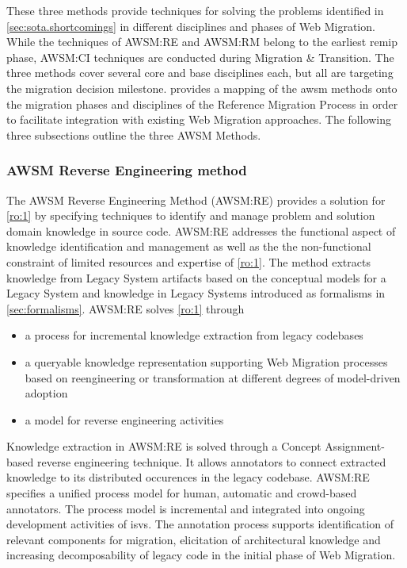These three methods provide techniques for solving the problems identified in \cref{sec:sota.shortcomings} in different  disciplines and phases of \gls{Web Migration}.
While the techniques of AWSM:RE and AWSM:RM belong to the earliest \gls{remip} phase, AWSM:CI techniques are conducted during Migration \& Transition.
The three methods cover several core and base disciplines each, but all are targeting the migration decision milestone.
 provides a mapping of the \gls{awsm} methods onto the migration phases and disciplines of the Reference Migration Process \autocite{Sneed2010ReMiP} in order to facilitate integration with existing \gls{Web Migration} approaches. %
The following three subsections outline the three AWSM Methods.

\hypertarget{awsm-reverse-engineering-method}{%
\subsubsection*{AWSM Reverse Engineering method}\label{awsm-reverse-engineering-method}}

The AWSM Reverse Engineering Method (AWSM:RE) provides a solution for \cref{ro:1} by specifying techniques to identify and manage problem and solution domain knowledge in  source code.
AWSM:RE addresses the functional aspect of knowledge identification and management as well as the the non-functional constraint of limited resources and expertise of \cref{ro:1}.
The method extracts knowledge from \gls{Legacy System} \glspl{artifact} based on the conceptual models for a \gls{Legacy System} and knowledge in \glspl{Legacy System} introduced as formalisms in \cref{sec:formalisms}.
AWSM:RE solves \cref{ro:1} through
\begin{itemize}
\item a process for incremental knowledge extraction from legacy codebases
\item a queryable knowledge representation supporting \gls{Web Migration} processes based on reengineering or transformation at different degrees of model-driven adoption
\item a model for  reverse engineering activities
\end{itemize}

\par\smallskip
Knowledge extraction in AWSM:RE is solved through a \gls{Concept Assignment}-based reverse engineering technique.
It allows annotators to connect extracted knowledge to its distributed occurences in the legacy codebase.
AWSM:RE specifies a unified process model for human, automatic and crowd-based annotators.
The process model is incremental and integrated into ongoing development activities of \glspl{isv}.
The annotation process supports identification of relevant components for migration, elicitation of architectural knowledge and increasing decomposability of legacy code in the initial phase of \gls{Web Migration}.

